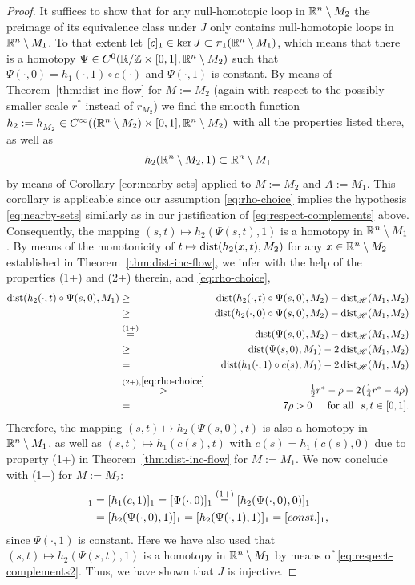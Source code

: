 \begin{proof}
It suffices to show that for any null-homotopic loop in $\mathbb{R}^n\setminus M_2$ the 
preimage of its equivalence class under $J$ only contains null-homotopic 
loops in $\mathbb{R}^n\setminus M_1$. To that extent let $[c]_1\in\ker J\subset
\pi_1(\mathbb{R}^n\setminus M_1)$,
which means that there is a homotopy $\Psi\in C^0(%
\R/\Z\times [0,1],\R^n\setminus
M_2)$ such that $\Psi(\cdot,0)=h_1(\cdot,1)\circ c(\cdot)$ and
$\Psi(\cdot,1)$ is constant. By means of Theorem~\ref{thm:dist-inc-flow}
for $M:=M_2$ (again with respect to the possibly smaller
scale $r^*$ instead of $r_{M_2}$)
we find the smooth function $h_2:=h_{M_2}^+ 
\in C^\infty((\mathbb{R}^n\setminus M_2)\times[0,1],\mathbb{R}^n\setminus M_2)$ 
with all the properties
listed there, as well as
\begin{equation}\label{eq:respect-complements2}
h_2(\mathbb{R}^n\setminus M_2,1)\subset \mathbb{R}^n\setminus M_1
\end{equation}
by means of Corollary \ref{cor:nearby-sets} applied to $M:=M_2$ and
$A:= M_1$. This corollary is applicable since our assumption \eqref{eq:rho-choice}
implies the hypothesis \eqref{eq:nearby-sets} similarly as in our
justification of \eqref{eq:respect-complements} above. Consequently,
the mapping $(s,t)\mapsto h_2(\Psi(s,t),1)$ is a homotopy in $\mathbb{R}^n\setminus M_1$.
By means of the monotonicity of $t\mapsto\operatorname{dist}(h_2(x,t),M_2)$ for any
$x\in\mathbb{R}^n\setminus M_2$ established in Theorem~\ref{thm:dist-inc-flow},
we infer with the help of the properties (1+) and (2+) therein, and 
\eqref{eq:rho-choice},
\begin{eqnarray*}
\operatorname{dist}(h_2(\cdot,t)\circ\Psi(s,0),M_1) & \ge &\operatorname{dist}(h_2(\cdot,t)\circ\Psi(s,0),M_2)
-\operatorname{dist}_{\mathscr{H}}(M_1,M_2)\\
&\ge &\operatorname{dist}(h_2(\cdot,0)\circ\Psi(s,0),M_2)
-\operatorname{dist}_{\mathscr{H}}(M_1,M_2)\\
&\overset{\textnormal{(1+)}}{=} &\operatorname{dist}(\Psi(s,0),M_2)
-\operatorname{dist}_{\mathscr{H}}(M_1,M_2)\\
&\ge &\operatorname{dist}(\Psi(s,0),M_1)
-2\operatorname{dist}_{\mathscr{H}}(M_1,M_2)\\
&=& \operatorname{dist}(h_1(\cdot,1)\circ c(s),M_1)-2\operatorname{dist}_{\mathscr{H}}(M_1,M_2)\\
&\overset{\textnormal{(2+)},\eqref{eq:rho-choice}}{>} &
\textstyle\frac12 r^*-\rho-2\big(\frac14 r^*-4\rho\big)\\
& = & 7\rho >0\quad\,\,\,\text{for all }\,\, s,t\in [0,1].
\end{eqnarray*}
Therefore, the mapping $(s,t)\mapsto h_2(\Psi(s,0),t)$ is also a homotopy
in $\mathbb{R}^n\setminus M_1$, as well as $(s,t)\mapsto h_1(c(s),t)$ with $
c(s)=h_1(c(s),0)$ due to property (1+) in Theorem~\ref{thm:dist-inc-flow}
for $M:=M_1$. We now conclude with (1+) for $M:=M_2$:
\begin{align*}
[c]_1 & = [h_1(c,1)]_1=[\Psi(\cdot,0)]_1\overset{\textnormal{(1+)}}{=}
[h_2(\Psi(\cdot,0),0)]_1\\
& = [h_2(\Psi(\cdot,0),1)]_1=[h_2(\Psi(\cdot,1),1)]_1=[const.]_1,
\end{align*}
since $\Psi(\cdot,1)$ is constant. Here we have also used that $(s,t)\mapsto
h_2(\Psi(s,t),1)$ is a homotopy in $\mathbb{R}^n\setminus M_1$ by means of 
\eqref{eq:respect-complements2}. Thus, we have shown that $J$ is injective.
\end{proof}
